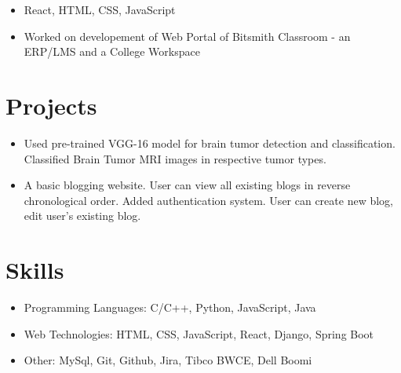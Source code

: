 \documentclass{resume}
\begin{document}
\begin{itemize}
 \item React, HTML, CSS, JavaScript
 \item Worked on developement of Web Portal of Bitsmith Classroom - an ERP/LMS and a College Workspace
\end{itemize}

\section{Projects}
\begin{itemize}
 \item Used pre-trained VGG-16 model for brain tumor detection and classification. Classified Brain Tumor MRI images in respective tumor types.
\end{itemize}

 {}
\begin{itemize}
 \item A basic blogging website. User can view all existing blogs in reverse chronological order. Added authentication system. User can create new blog, edit user's existing blog.
\end{itemize}



\section{Skills}
\begin{itemize}[parsep=0.5ex]
  \item Programming Languages: C/C++, Python, JavaScript, Java
  \item Web Technologies: HTML, CSS, JavaScript, React, Django, Spring Boot
  \item Other: MySql, Git, Github, Jira, Tibco BWCE, Dell Boomi
\end{itemize}
\end{document}
